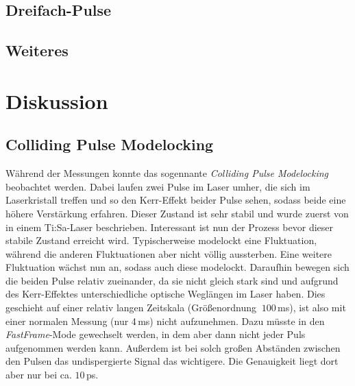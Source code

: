 \documentclass[bachelor,       %
               twoside,        %
               BCOR10mm,       %
               english,ngerman, %
               ]{GAUBM}
\begin{document}
%   

\section{Dreifach-Pulse}

\section{Weiteres}

\chapter{Diskussion}
\section{Colliding Pulse Modelocking}
Während der Messungen konnte das sogennante \textit{Colliding Pulse Modelocking} beobachtet werden.
Dabei laufen zwei Pulse im Laser umher, die sich im Laserkristall treffen und so den Kerr-Effekt beider Pulse sehen, sodass beide eine höhere Verstärkung erfahren.
Dieser Zustand ist sehr stabil und wurde zuerst von \cite{lai_multiple_1997} in einem Ti:Sa-Laser beschrieben.
Interessant ist nun der Prozess bevor dieser stabile Zustand erreicht wird.
Typischerweise modelockt eine Fluktuation, während die anderen Fluktuationen aber nicht völlig aussterben.
Eine weitere Fluktuation wächst nun an, sodass auch diese modelockt.
Daraufhin bewegen sich die beiden Pulse relativ zueinander, da sie nicht gleich stark sind und aufgrund des Kerr-Effektes unterschiedliche optische Weglängen im Laser haben.
Dies geschieht auf einer relativ langen Zeitskala (Größenordnung $~100\,$ms), ist also mit einer normalen Messung (nur 4\,ms) nicht aufzunehmen.
Dazu müsste in den \textit{FastFrame}-Mode gewechselt werden, in dem aber dann nicht jeder Puls aufgenommen werden kann.
Außerdem ist bei solch großen Abständen zwischen den Pulsen das undispergierte Signal das wichtigere.
Die Genauigkeit liegt dort aber nur bei ca. $10\,$ps.
\end{document}
